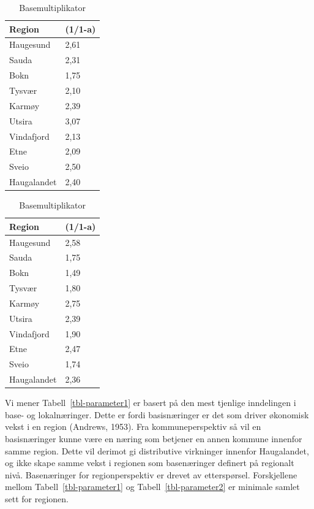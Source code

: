 \documentclass[
]{article}
\begin{document}
\begin{table}

\caption{\label{tbl-parameter}Basemultiplikator}\begin{minipage}[t]{0.50\linewidth}

{\centering 

\begin{tabular}[t]{ll}
\toprule
Region & (1/1-a)\\
\midrule
Haugesund & 2,61\\
Sauda & 2,31\\
Bokn & 1,75\\
Tysvær & 2,10\\
Karmøy & 2,39\\
Utsira & 3,07\\
Vindafjord & 2,13\\
Etne & 2,09\\
Sveio & 2,50\\
Haugalandet & 2,40\\
\bottomrule
\end{tabular}

}

\end{minipage}%
%
\begin{minipage}[t]{0.50\linewidth}

{\centering 

\begin{tabular}[t]{ll}
\toprule
Region & (1/1-a)\\
\midrule
Haugesund & 2,58\\
Sauda & 1,75\\
Bokn & 1,49\\
Tysvær & 1,80\\
Karmøy & 2,75\\
Utsira & 2,39\\
Vindafjord & 1,90\\
Etne & 2,47\\
Sveio & 1,74\\
Haugalandet & 2,36\\
\bottomrule
\end{tabular}

}

\end{minipage}%

\end{table}

Vi mener Tabell~\ref{tbl-parameter1} er basert på den mest tjenlige
inndelingen i base- og lokalnæringer. Dette er fordi basisnæringer er
det som driver økonomisk vekst i en region (Andrews, 1953). Fra
kommuneperspektiv så vil en basisnæringer kunne være en næring som
betjener en annen kommune innenfor samme region. Dette vil derimot gi
distributive virkninger innenfor Haugalandet, og ikke skape samme vekst
i regionen som basenæringer definert på regionalt nivå. Basenæringer for
regionperspektiv er drevet av etterspørsel. Forskjellene mellom
Tabell~\ref{tbl-parameter1} og Tabell~\ref{tbl-parameter2} er minimale
samlet sett for regionen.
\end{document}
